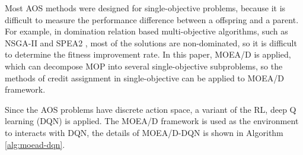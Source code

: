 \documentclass[journal]{IEEEtran}
\begin{document}
Most AOS methods were designed for single-objective problems, because it is difficult to measure the performance difference between a offspring and a parent.
For example, in domination relation based multi-objective algorithms, such as NSGA-II \cite{nsga2} and SPEA2 \cite{spea2}, most of the solutions are non-dominated, so it is difficult to determine the fitness improvement rate.
In this paper, MOEA/D is applied, which can decompose MOP into several single-objective subproblems, so the methods of credit assignment in single-objective can be applied to MOEA/D framework.

Since the AOS problems have discrete action space, a variant of the RL, deep Q learning (DQN) is applied.
The MOEA/D framework is used as the environment to interacts with DQN,
the details of MOEA/D-DQN is shown in Algorithm \ref{alg:moead-dqn}.
\end{document}
